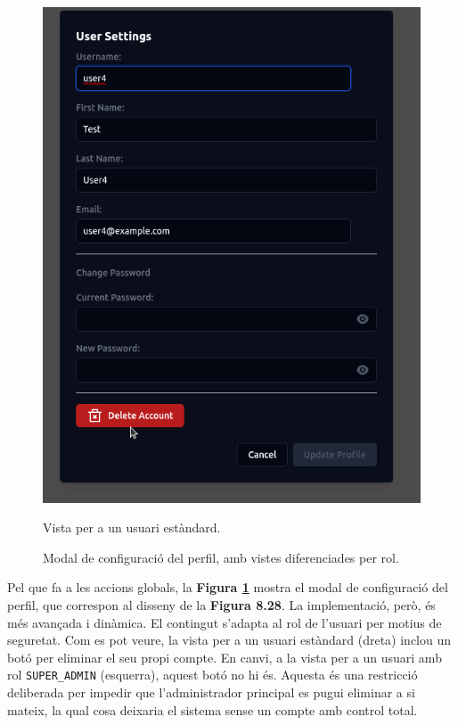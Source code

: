 \begin{figure}[H]
\begin{minipage}{0.48\textwidth}
        \includegraphics[width=\linewidth]{Figures/ui-web/user_settings_dialog_not_super_admin.png}
        \caption{Vista per a un usuari estàndard.}
        \label{fig:react-user-settings-user-impl}
    \end{minipage}
    \caption{Modal de configuració del perfil, amb vistes diferenciades per rol.}
    \label{fig:react-user-settings-impl}
\end{figure}

Pel que fa a les accions globals, la \textbf{Figura \ref{fig:react-user-settings-impl}} mostra el modal de configuració del perfil, que correspon al disseny de la \textbf{Figura 8.28}. La implementació, però, és més avançada i dinàmica. El contingut s'adapta al rol de l'usuari per motius de seguretat. Com es pot veure, la vista per a un usuari estàndard (dreta) inclou un botó per eliminar el seu propi compte. En canvi, a la vista per a un usuari amb rol \texttt{SUPER\_ADMIN} (esquerra), aquest botó no hi és. Aquesta és una restricció deliberada per impedir que l'administrador principal es pugui eliminar a si mateix, la qual cosa deixaria el sistema sense un compte amb control total.

